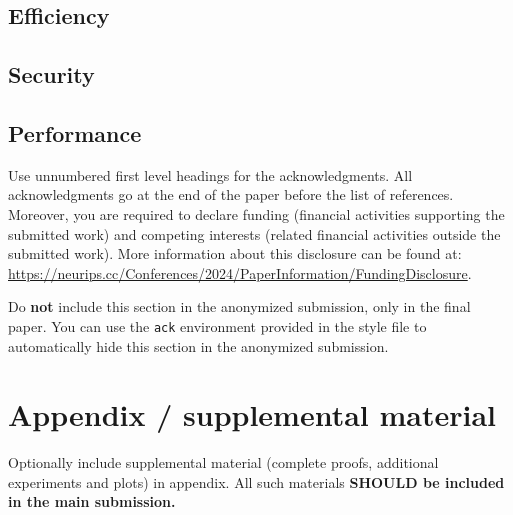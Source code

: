 \documentclass{article}
\begin{document}
\subsection{Efficiency}
\subsection{Security}

\subsection{Performance}

\begin{ack}
Use unnumbered first level headings for the acknowledgments. All acknowledgments
go at the end of the paper before the list of references. Moreover, you are required to declare
funding (financial activities supporting the submitted work) and competing interests (related financial activities outside the submitted work).
More information about this disclosure can be found at: \url{https://neurips.cc/Conferences/2024/PaperInformation/FundingDisclosure}.


Do {\bf not} include this section in the anonymized submission, only in the final paper. You can use the \texttt{ack} environment provided in the style file to automatically hide this section in the anonymized submission.
\end{ack}




\newpage

\appendix

\section{Appendix / supplemental material}

Optionally include supplemental material (complete proofs, additional experiments and plots) in appendix.
All such materials \textbf{SHOULD be included in the main submission.}
\end{document}
